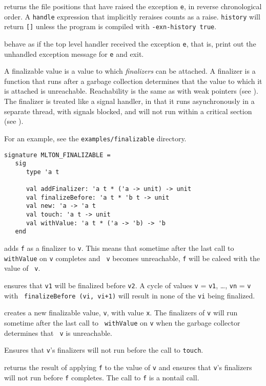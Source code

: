 \begin{description}

returns the file positions that have raised the exception {\tt e}, in reverse
chronological order.   A {\tt handle} expression that implicitly reraises counts
as a raise.  {\tt history} will return {\tt []} unless the program is compiled
with {\tt -exn-history true}.

behave as if the top level handler received the exception {\tt e},
that is, print out the unhandled exception message for {\tt e} and
exit.

\end{description}

A finalizable value is a value to which {\em finalizers} can be
attached.  A finalizer is a function that runs after a garbage
collection determines that the value to which it is attached is
unreachable.  Reachability is the same as with weak pointers (see
).  The finalizer is treated like a signal handler, in
that it runs asynchronously in a separate thread, with signals
blocked, and will not run within a critical section (see
).

For an example, see the {\tt examples/finalizable} directory.

\begin{verbatim}
signature MLTON_FINALIZABLE =
   sig
      type 'a t

      val addFinalizer: 'a t * ('a -> unit) -> unit
      val finalizeBefore: 'a t * 'b t -> unit
      val new: 'a -> 'a t
      val touch: 'a t -> unit
      val withValue: 'a t * ('a -> 'b) -> 'b
   end
\end{verbatim}

\begin{description}

adds {\tt f} as a finalizer to {\tt v}.  This means that sometime
after the last call to {\tt withValue} on {\tt v} completes and {\tt
v} becomes unreachable, {\tt f} will be caleed with the value of {\tt
v}.

ensures that {\tt v1} will be finalized before {\tt v2}.  A cycle of
values {\tt v} = {\tt v1}, \ldots, {\tt vn} = {\tt v} with {\tt
finalizeBefore (vi, vi+1)} will result in none of the {\tt vi} being
finalized.

creates a new finalizable value, {\tt v}, with value {\tt x}.  The
finalizers of {\tt v} will run sometime after the last call to {\tt
withValue} on {\tt v} when the garbage collector determines that {\tt
v} is unreachable.

Ensures that {\tt v}'s finalizers will not run before the call to
{\tt touch}.

returns the result of applying {\tt f} to the value of {\tt v} and
ensures that {\tt v}'s finalizers will not run before {\tt f}
completes.  The call to {\tt f} is a nontail call.

\end{description}

